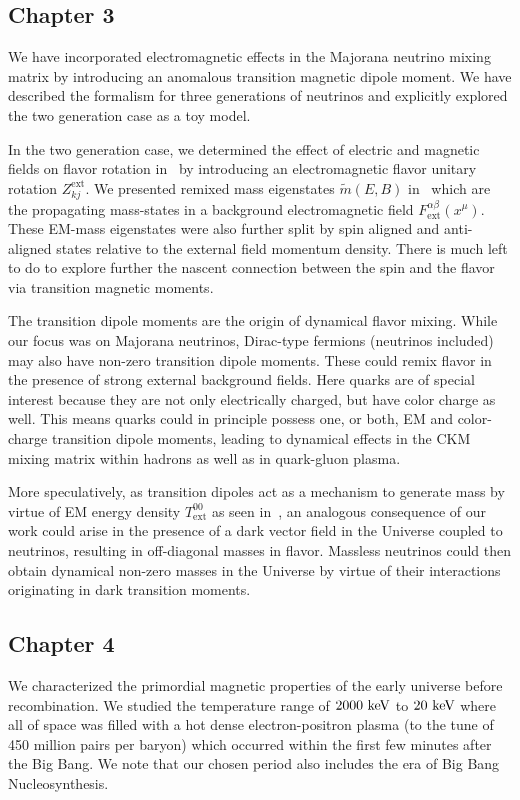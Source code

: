 \subsection{Chapter 3}
\label{sec:chap3}
We have incorporated electromagnetic effects in the Majorana neutrino mixing matrix by introducing an anomalous transition magnetic dipole moment. We have described the formalism for three generations of neutrinos and explicitly explored the two generation case as a toy model. 

In the two generation case, we determined the effect of electric and magnetic fields on flavor rotation in~ by introducing an electromagnetic flavor unitary rotation $Z_{kj}^\mathrm{ext}$. We presented remixed mass eigenstates $\widetilde m(E,B)$ in~ which are the propagating mass-states in a background electromagnetic field $F^{\alpha\beta}_\mathrm{ext}(x^{\mu})$. These EM-mass eigenstates were also further split by spin aligned and anti-aligned states relative to the external field momentum density. There is much left to do to explore further the nascent connection between the spin and the flavor via transition magnetic moments. 

The transition dipole moments are the origin of dynamical flavor mixing. While our focus was on Majorana neutrinos, Dirac-type fermions (neutrinos included) may also have non-zero transition  dipole moments. These could  remix flavor in the presence of strong external background fields. Here  quarks  are of special interest because they are not only electrically charged, but have color charge as well. This means quarks could in principle possess one, or both, EM and color-charge transition dipole moments, leading to dynamical effects in the CKM mixing matrix within hadrons as well as in quark-gluon plasma.

More speculatively, as transition dipoles act as a mechanism to generate mass by virtue of EM energy density $T_\mathrm{ext}^{00}$ as seen in~, an analogous consequence of our work could arise in the presence of a dark vector field in the Universe coupled to neutrinos, resulting in off-diagonal masses in flavor. Massless neutrinos could then obtain dynamical non-zero masses in the Universe by virtue of their interactions originating in dark transition moments.

\subsection{Chapter 4}
\label{sec:chap4}
We characterized the primordial magnetic properties of the early universe before recombination. We studied the temperature range of $2000\text{ keV}$ to $20\text{ keV}$ where all of space was filled with a hot dense electron-positron plasma (to the tune of 450 million pairs per baryon) which occurred within the first few minutes after the Big Bang. We note that our chosen period also includes the era of Big Bang Nucleosynthesis.

